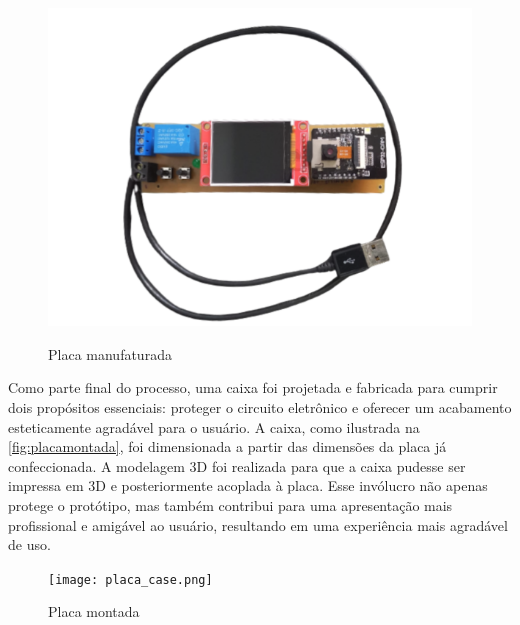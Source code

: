 \begin{figure}[h!]
    \centering
    \caption{Placa manufaturada}
    \includegraphics[scale=0.35]{figuras/placa_montada.png}
    \fonte{}%
    \label{fig:placamanufaturada}
    \centering
\end{figure}

Como parte final do processo, uma caixa foi projetada e fabricada para cumprir 
dois propósitos essenciais: proteger o circuito eletrônico e oferecer um 
acabamento esteticamente agradável para o usuário. A caixa, como ilustrada 
na \autoref{fig:placamontada}, foi dimensionada a partir das dimensões da placa 
já confeccionada. A modelagem 3D foi realizada para que a caixa pudesse 
ser impressa em 3D e posteriormente acoplada à placa. Esse invólucro 
não apenas protege o protótipo, mas também contribui para uma 
apresentação mais profissional e amigável ao usuário, resultando em 
uma experiência mais agradável de uso.

\begin{figure}[h!]
    \centering
    \caption{Placa montada}
    \texttt{[image: placa\_case.png]}
    \fonte{}%
    \label{fig:placamontada}
    \centering
\end{figure}